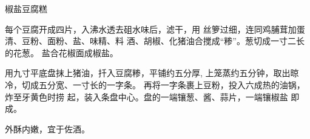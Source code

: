 \begin{recipe}{椒盐豆腐糕}

\ingredients


\cooking

\step 	每个豆腐开成四片，入沸水透去砠水味后，滤干，用 丝箩过细，连同鸡脯茸加蛋清、豆粉、面粉、盐、味精、料 酒、胡椒、化猪油合搅成“糁”。葱切成一寸二长的花葱。 盐合花椒面成椒盐。

\step 	用九寸平底盘抹上猪油，扦入豆腐糁，平铺约五分厚, 上笼蒸约五分钟，取出晾冷，切成五分宽、一寸长的一字条。 再将一字条裹上豆粉，投入六成热的油锅，炸至牙黄色时捞 起，装入条盘中心。盘的一端镶葱、酱、蒜片，一端镶椒盐 即成。

\notes

外酥内嫩，宜于佐酒。

\end{recipe}

